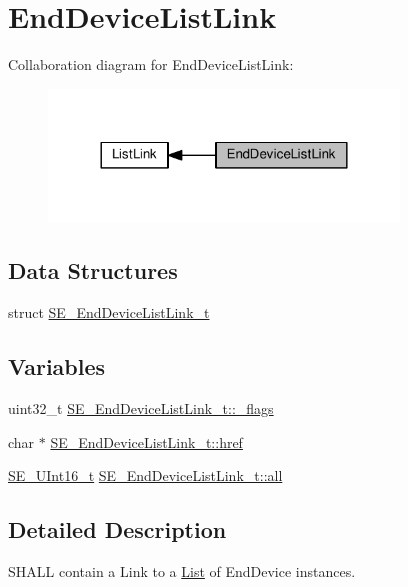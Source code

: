 \hypertarget{group__EndDeviceListLink}{}\section{End\+Device\+List\+Link}
\label{group__EndDeviceListLink}
Collaboration diagram for End\+Device\+List\+Link\+:\nopagebreak
\begin{figure}[H]
\begin{center}
\leavevmode
\includegraphics[width=264pt]{group__EndDeviceListLink}
\end{center}
\end{figure}
\subsection*{Data Structures}
\begin{DoxyCompactItemize}
\item 
struct \hyperlink{structSE__EndDeviceListLink__t}{S\+E\+\_\+\+End\+Device\+List\+Link\+\_\+t}
\end{DoxyCompactItemize}
\subsection*{Variables}
\begin{DoxyCompactItemize}
\item 
uint32\+\_\+t \hyperlink{group__EndDeviceListLink_ga875ed914707e5607614df916298bef65}{S\+E\+\_\+\+End\+Device\+List\+Link\+\_\+t\+::\+\_\+flags}
\item 
char $\ast$ \hyperlink{group__EndDeviceListLink_ga240c0bf38b6059ce62221922aee9b08f}{S\+E\+\_\+\+End\+Device\+List\+Link\+\_\+t\+::href}
\item 
\hyperlink{group__UInt16_gac68d541f189538bfd30cfaa712d20d29}{S\+E\+\_\+\+U\+Int16\+\_\+t} \hyperlink{group__EndDeviceListLink_gae6814db0fb5e290316ad9b78953de83a}{S\+E\+\_\+\+End\+Device\+List\+Link\+\_\+t\+::all}
\end{DoxyCompactItemize}


\subsection{Detailed Description}
S\+H\+A\+LL contain a Link to a \hyperlink{structList}{List} of End\+Device instances. 


